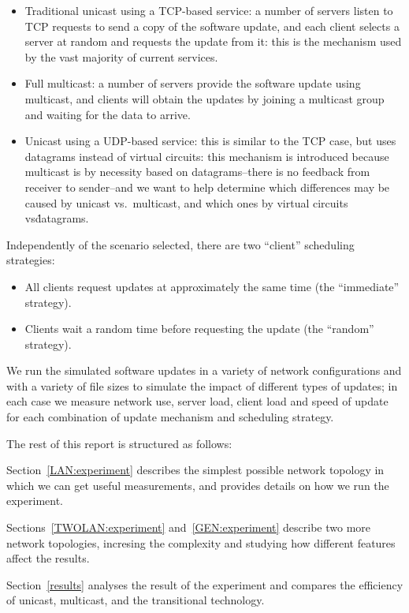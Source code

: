 \documentclass[a4paper,12pt]{article}
\begin{document}
\begin{itemize}
\item Traditional unicast using a TCP-based service: a number
of servers listen to TCP requests to send a copy of the software
update, and each client selects a server at random and requests
the update from it: this is the mechanism used by the vast
majority of current services.
\item Full multicast: a number of servers provide the software
update using multicast, and clients will obtain the updates by
joining a multicast group and waiting for the data to arrive.
\item Unicast using a UDP-based service: this is similar to the
TCP case, but uses datagrams instead of virtual circuits: this
mechanism is introduced because multicast is by necessity based
on datagrams--there is no feedback from receiver to sender--and
we want to help determine which differences may be caused by
unicast vs.\ multicast, and which ones by virtual circuits vs\.
datagrams.
\end{itemize}

Independently of the scenario selected, there are two ``client''
scheduling strategies:

\begin{itemize}
\item All clients request updates at approximately the same time
(the ``immediate'' strategy).
\item Clients wait a random time before requesting the update
(the ``random'' strategy).
\end{itemize}

We run the simulated software updates in a variety of network
configurations and with a variety of file sizes to simulate the
impact of different types of updates; in each case we measure network
use, server load, client load and speed of update for each combination
of update mechanism and scheduling strategy.

The rest of this report is structured as follows:

Section~\ref{LAN:experiment} describes the simplest possible network
topology in which we can get useful measurements, and provides details
on how we run the experiment.

Sections~\ref{TWOLAN:experiment} and~\ref{GEN:experiment} describe
two more network topologies, incresing the complexity and studying
how different features affect the results.

Section~\ref{results} analyses the result of the experiment and compares
the efficiency of unicast, multicast, and the transitional technology.
\end{document}
